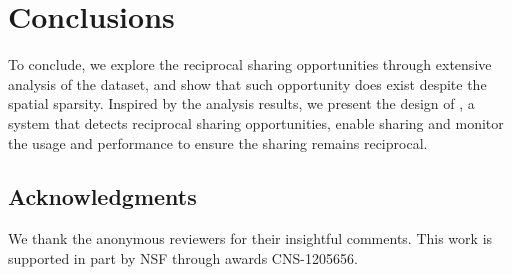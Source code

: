 \section{Conclusions}
\label{sec:conclusion}

To conclude, we explore the reciprocal sharing opportunities through extensive
analysis of the \PhoneLab{} \wifi{} dataset, and show that such opportunity does
exist despite the spatial sparsity. Inspired by the analysis results, we present
the design of \wisefi{}, a system that detects reciprocal sharing opportunities,
enable \wifi{} sharing and monitor the \wifi{} usage and performance to ensure
the sharing remains reciprocal.


\subsection*{Acknowledgments}
We thank the anonymous reviewers for their insightful comments. This work is
supported in part by NSF through awards CNS-1205656.
